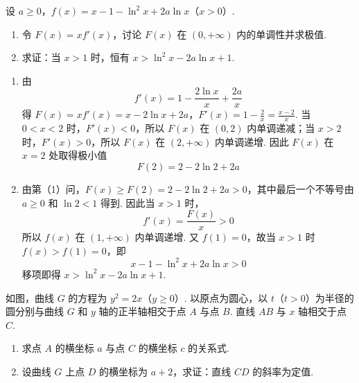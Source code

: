 \begin{problem}
设 \(a \geqslant 0\)，\(f(x) = x - 1 - \ln^2 x + 2a \ln x\)（\(x > 0\)）.

\begin{enumerate}
\item 令 \(F(x) = xf'(x)\)，讨论 \(F(x)\) 在 \((0, +\infty)\) 内的单调性并求极值.
\item 求证：当 \(x > 1\) 时，恒有 \(x > \ln^{2} x - 2a \ln x + 1\).
\end{enumerate}
\end{problem}

\begin{solution}
\begin{enumerate}
\item
由
\[
f'(x)=1-\frac{2\ln x}{x}+\frac{2a}{x}
\]
得
\(F(x)=xf'(x)=x-2\ln x+2a\)，\(F'(x)=1-\frac2x=\frac{x-2}{x}\).
当 \(0<x<2\) 时，\(F'(x)<0\)，所以 \(F(x)\) 在 \((0,2)\) 内单调递减；当 \(x>2\) 时，\(F'(x)>0\)，所以 \(F(x)\) 在 \((2,+\infty)\) 内单调递增. 因此 \(F(x)\) 在 \(x=2\) 处取得极小值
\[
F(2)=2-2\ln2+2a
\]

\item 由第（1）问，\(F(x)\geqslant F(2)=2-2\ln2+2a>0\)，其中最后一个不等号由 \(a\geqslant0\) 和 \(\ln2<1\) 得到. 因此当 \(x>1\) 时，
\[
f'(x)=\frac{F(x)}{x}>0
\]
所以 \(f(x)\) 在 \((1,+\infty)\) 内单调递增. 又 \(f(1)=0\)，故当 \(x>1\) 时 \(f(x)>f(1)=0\)，即
\[
x-1-\ln^2x+2a\ln x>0
\]
移项即得 \(x>\ln^2x-2a\ln x+1\).
\end{enumerate}
\end{solution}

\begin{problem}
如图，曲线 \(G\) 的方程为 \(y^{2} = 2x\)（\(y \geqslant 0\)）. 以原点为圆心，以 \(t\)（\(t > 0\)）为半径的圆分别与曲线 \(G\) 和 \(y\) 轴的正半轴相交于点 \(A\) 与点 \(B\). 直线 \(AB\) 与 \(x\) 轴相交于点 \(C\).

\begin{enumerate}
\item 求点 \(A\) 的横坐标 \(a\) 与点 \(C\) 的横坐标 \(c\) 的关系式.
\item 设曲线 \(G\) 上点 \(D\) 的横坐标为 \(a + 2\)，求证：直线 \(CD\) 的斜率为定值.
\end{enumerate}

\end{problem}

